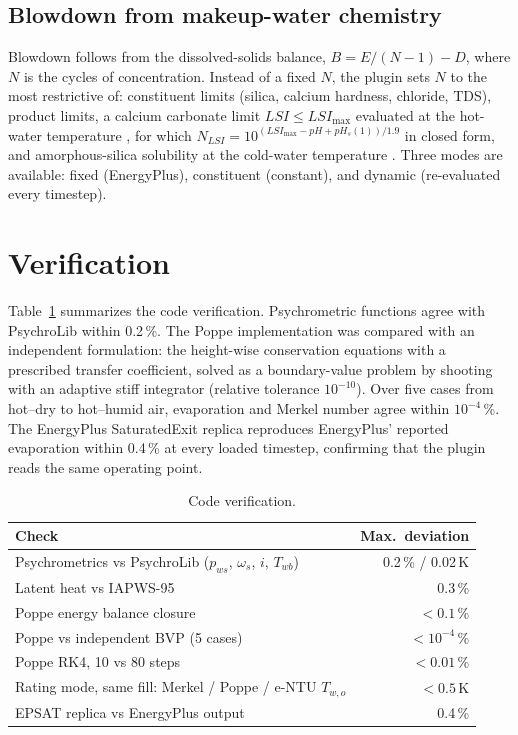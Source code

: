 \documentclass[preprint,12pt,authoryear]{elsarticle}
\begin{document}
\subsection{Blowdown from makeup-water chemistry}\label{sec:chem}
Blowdown follows from the dissolved-solids balance, $B = E/(N-1) - D$, where $N$ is the cycles of concentration.
Instead of a fixed $N$, the plugin sets $N$ to the most restrictive of: constituent limits (silica, calcium hardness,
chloride, TDS), product limits, a calcium carbonate limit $LSI\le LSI_{\max}$ evaluated at the hot-water temperature
\citep{langelier1936analytical}, for which $N_{LSI} = 10^{(LSI_{\max}-pH+pH_s(1))/1.9}$ in closed form, and amorphous-silica
solubility at the cold-water temperature \citep{fournier1977chemical}. Three modes are available: fixed (EnergyPlus),
constituent (constant), and dynamic (re-evaluated every timestep).

\section{Verification}\label{sec:verification}
Table~\ref{tab:verification} summarizes the code verification. Psychrometric functions agree with PsychroLib
\citep{meyer2019psychrolib} within 0.2\,\%. The Poppe implementation was compared with an independent formulation:
the height-wise conservation equations with a prescribed transfer coefficient, solved as a boundary-value problem by
shooting with an adaptive stiff integrator (relative tolerance $10^{-10}$). Over five cases from hot--dry to
hot--humid air, evaporation and Merkel number agree within $10^{-4}$\,\%. The EnergyPlus SaturatedExit replica reproduces
EnergyPlus' reported evaporation within 0.4\,\% at every loaded timestep, confirming that the plugin reads the same
operating point.

\begin{table}[t]\centering\small
\caption{Code verification.}\label{tab:verification}
\begin{tabular}{lr}\toprule
Check & Max.\ deviation \\\midrule
Psychrometrics vs PsychroLib ($p_{ws}$, $\omega_s$, $i$, $T_{wb}$) & 0.2\,\% / 0.02\,K \\
Latent heat vs IAPWS-95 \citep{wagner2002iapws} & 0.3\,\% \\
Poppe energy balance closure & $<0.1$\,\% \\
Poppe vs independent BVP (5 cases) & $<10^{-4}$\,\% \\
Poppe RK4, 10 vs 80 steps & $<0.01$\,\% \\
Rating mode, same fill: Merkel / Poppe / e-NTU $T_{w,o}$ & $<0.5$\,K \\
EPSAT replica vs EnergyPlus output & 0.4\,\% \\\bottomrule
\end{tabular}
\end{table}
\end{document}
